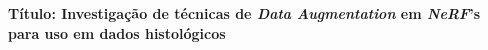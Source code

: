 \documentclass[12pt,a4paper]{article}
\begin{document}



%



{\large \bfseries Título: Investigação de técnicas de \textit{Data Augmentation} em \textit{NeRF}'s para uso em dados histológicos}






\newpage




\end{document}

